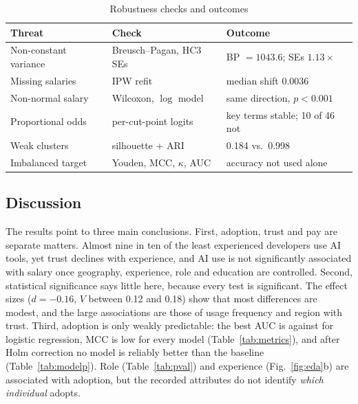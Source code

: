 \documentclass[conference]{IEEEtran}
\begin{document}
\begin{table}[t]
\caption{Robustness checks and outcomes}
\label{tab:robust}
\centering
\small
\begin{tabular}{@{}p{2.3cm}p{2.7cm}p{2.5cm}@{}}
\toprule
\textbf{Threat} & \textbf{Check} & \textbf{Outcome} \\
\midrule
Non-constant variance & Breusch--Pagan, HC3 SEs & BP $=1043.6$; SEs $1.13\times$ \\
Missing salaries & IPW refit & median shift 0.0036 \\
Non-normal salary & Wilcoxon, $\log$ model & same direction, $p<0.001$ \\
Proportional odds & per-cut-point logits & key terms stable; 10 of 46 not \\
Weak clusters & silhouette + ARI & 0.184 vs.\ 0.998 \\
Imbalanced target & Youden, MCC, $\kappa$, AUC & accuracy not used alone \\
\bottomrule
\end{tabular}
\end{table}

\subsection{Discussion}
The results point to three main conclusions. First, adoption, trust and pay are separate matters. Almost nine in ten of the least experienced developers use AI tools, yet trust declines with experience, and AI use is not significantly associated with salary once geography, experience, role and education are controlled. Second, statistical significance says little here, because every test is significant. The effect sizes ($d=-0.16$, $V$ between 0.12 and 0.18) show that most differences are modest, and the large associations are those of usage frequency and region with trust. Third, adoption is only weakly predictable: the best AUC is \bestAUC{} against \lrAUC{} for logistic regression, MCC is low for every model (Table~\ref{tab:metrics}), and after Holm correction no model is reliably better than the baseline (Table~\ref{tab:modelp}). Role (Table~\ref{tab:pval}) and experience (Fig.~\ref{fig:eda}b) are associated with adoption, but the recorded attributes do not identify \emph{which individual} adopts.

\end{document}
